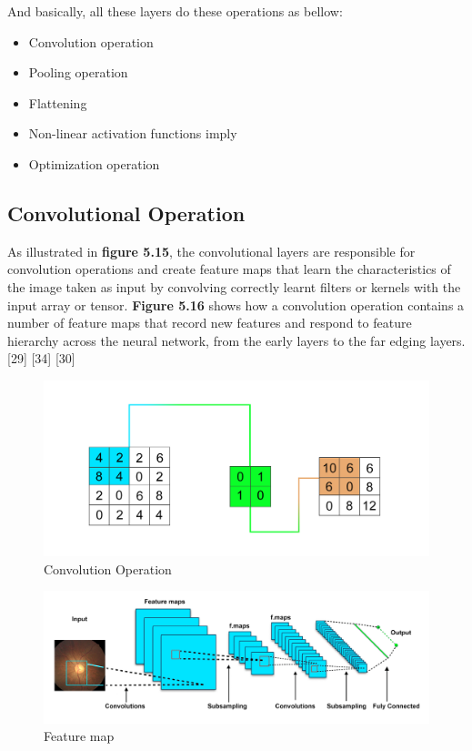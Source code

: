 \noindent And basically, all these layers do these operations as bellow:

\vspace{5mm}
\begin{itemize}
    \item Convolution operation
    \item Pooling operation
    \item Flattening
    \item Non-linear activation functions imply
    \item Optimization operation
\end{itemize}

\vspace{5mm}
\subsection{Convolutional Operation}


\vspace{5mm}
As illustrated in \textbf{figure 5.15}, the convolutional layers are responsible for convolution operations and create feature maps that learn the characteristics of the image taken as input by convolving correctly learnt filters or kernels with the input array or tensor. \textbf{Figure 5.16} shows how a convolution operation contains a number of feature maps that record new features and respond to feature hierarchy across the neural network, from the early layers to the far edging layers. [29] [34] [30]

\vspace{5mm}
\begin{figure}[hbt!]
\centering
\includegraphics[scale=0.5]{images/feature map.png}
\caption{Convolution Operation}
\label{fig:x Convolution Operation}
\end{figure}

\vspace{5mm}
\begin{figure}[hbt!]
\centering
\includegraphics[scale=0.4]{images/planes shown are a feature map.png}
\caption{Feature map}
\label{fig:x Feature map}
\end{figure}


